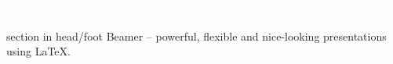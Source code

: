 \documentclass[aspectratio=169]{beamer}
\begin{document}
\begin{frame}[plain, b]
  \centering
  \Large \textcolor{white}{Thanks.}
  \normalsize

  \vspace*{\fill}

  \begin{beamercolorbox}[wd=\paperwidth]{section in head/foot}
    \centering
    \vskip8pt
    {\small Beamer -- powerful, flexible and nice-looking presentations using \LaTeX{}.}
    \vskip10pt
  \end{beamercolorbox}
  
\end{frame}
\end{document}
